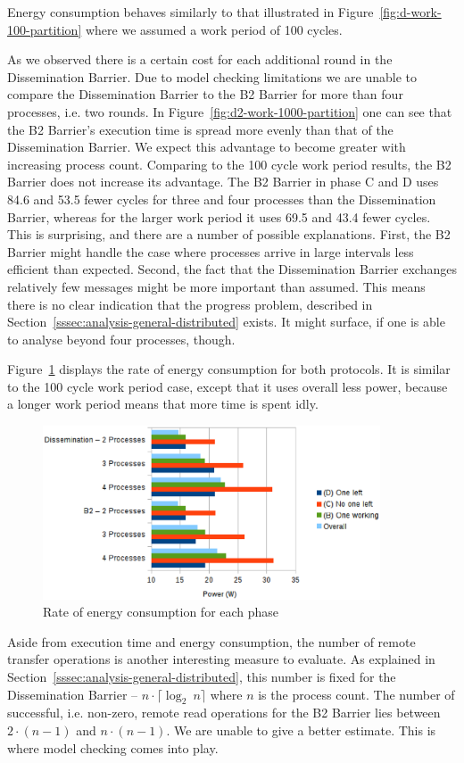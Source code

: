 \documentclass[a4paper, 10pt]{article}
\begin{document}
Energy consumption behaves similarly to that illustrated in Figure~\ref{fig:d-work-100-partition} where we assumed a work period of 100 cycles.

As we observed there is a certain cost for each additional round in the Dissemination Barrier. Due to model checking limitations we are unable to compare the Dissemination Barrier to the B2 Barrier for more than four processes, i.e. two rounds. In Figure~\ref{fig:d2-work-1000-partition} one can see that the B2 Barrier's execution time is spread more evenly than that of the Dissemination Barrier. We expect this advantage to become greater with increasing process count.
Comparing to the 100 cycle work period results, the B2 Barrier does not increase its advantage. The B2 Barrier in phase C and D uses 84.6 and 53.5 fewer cycles for three and four processes than the Dissemination Barrier, whereas for the larger work period it uses 69.5 and 43.4 fewer cycles. This is surprising, and there are a number of possible explanations. First, the B2 Barrier might handle the case where processes arrive in large intervals less efficient than expected. Second, the fact that the Dissemination Barrier exchanges relatively few messages might be more important than assumed. This means there is no clear indication that the progress problem, described in Section~\ref{sssec:analysis-general-distributed} exists. It might surface, if one is able to analyse beyond four processes, though.

Figure~\ref{fig:d2-power-work-1000} displays the rate of energy consumption for both protocols. It is similar to the 100 cycle work period case, except that it uses overall less power, because a longer work period means that more time is spent idly.
\begin{figure}[htbp]
	\centering
	\includegraphics[width=10cm]{charts/d2-power-work-1000}
	\caption{Rate of energy consumption for each phase}
	\label{fig:d2-power-work-1000}
\end{figure}

Aside from execution time and energy consumption, the number of remote transfer operations is another interesting measure to evaluate.
As explained in Section~\ref{sssec:analysis-general-distributed}, this number is fixed for the Dissemination Barrier -- $n \cdot \lceil \log _2~n \rceil$ where $n$ is the process count.
The number of successful, i.e. non-zero, remote read operations for the B2 Barrier lies between $2 \cdot (n-1)$ and $n \cdot (n-1)$. We are unable to give a better estimate. This is where model checking comes into play.
\end{document}
